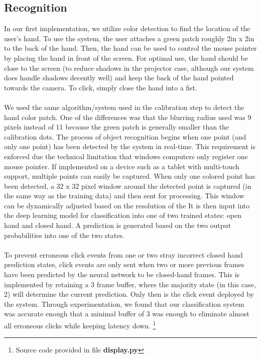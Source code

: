 \documentclass[twoside,twocolumn]{article}
\begin{document}
\subsection{Recognition}
In our first implementation, we utilize color detection to find the location of the user's hand. To use the system, the user attaches a green patch roughly 2in x 2in to the back of the hand. Then, the hand can be used to control the mouse pointer by placing the hand in front of the screen. For optimal use, the hand should be close to the screen (to reduce shadows in the projector case, although our system does handle shadows decently well) and keep the back of the hand pointed towards the camera. To click, simply close the hand into a fist.\\ \\
We used the same algorithm/system used in the calibration step to detect the hand color patch. One of the differences was that the blurring radius used was 9 pixels instead of 11 because the green patch is generally smaller than the calibration dots. The process of object recognition begins when one point (and only one point) has been detected by the system in real-time. This requirement is enforced due the technical limitation that windows computers only register one mouse pointer. If implemented on a device such as a tablet with multi-touch support, multiple points can easily be captured. When only one colored point has been detected, a 32 x 32 pixel window around the detected point is captured (in the same way as the training data) and then sent for processing. This window can be dynamically adjusted based on the resolution of the It is then input into the deep learning model for classification into one of two trained states: open hand and closed hand. A prediction is generated based on the two output probabilities into one of the two states. \\ \\ To prevent erroneous click events from one or two stray incorrect closed hand prediction states, click events are only sent when two or more previous frames have been predicted by the neural network to be closed-hand frames. This is implemented by retaining a 3 frame buffer, where the majority state (in this case, 2) will determine the current prediction. Only then is the click event deployed by the system. Through experimentation, we found that our classification system was accurate enough that a minimal buffer of 3 was enough to eliminate almost all erroneous clicks while keeping latency down. \footnote{Source code provided in file \textbf{display.py}}
\end{document}
